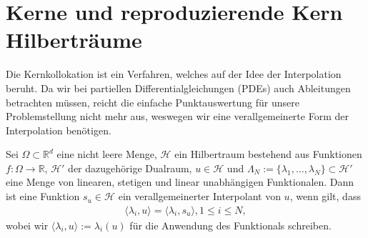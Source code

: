 \chapter{Kerne und reproduzierende Kern Hilberträume}
\label{cha:Grundlagen}

Die Kernkollokation ist ein Verfahren, welches auf der Idee der Interpolation beruht. Da wir bei partiellen Differentialgleichungen (\acs{PDE}s) auch Ableitungen betrachten müssen, reicht die einfache Punktauswertung für unsere Problemstellung nicht mehr aus, weswegen wir eine verallgemeinerte Form der Interpolation benötigen.

\begin{definition}
Sei $\Omega \subset \mathbb{R}^d$ eine nicht leere Menge, $\mathcal{H}$ ein Hilbertraum bestehend aus Funktionen $f:\Omega \rightarrow \mathbb{R}$, $\mathcal{H}'$ der dazugehörige Dualraum, $u \in \mathcal{H}$  und $\Lambda_N := \{\lambda_1, \dots, \lambda_N\} \subset \mathcal{H}'$ eine Menge von linearen, stetigen und linear unabhängigen Funktionalen. Dann ist eine Funktion $s_u \in \mathcal{H}$ ein verallgemeinerter Interpolant von $u$, wenn gilt, dass
\begin{align*}
\langle \lambda_i,u \rangle = \langle \lambda_i,s_u \rangle , 1\le i \le N,
\end{align*}
wobei wir $\langle \lambda_i, u \rangle := \lambda_i(u)$ für die Anwendung des Funktionals schreiben.
\end{definition}

